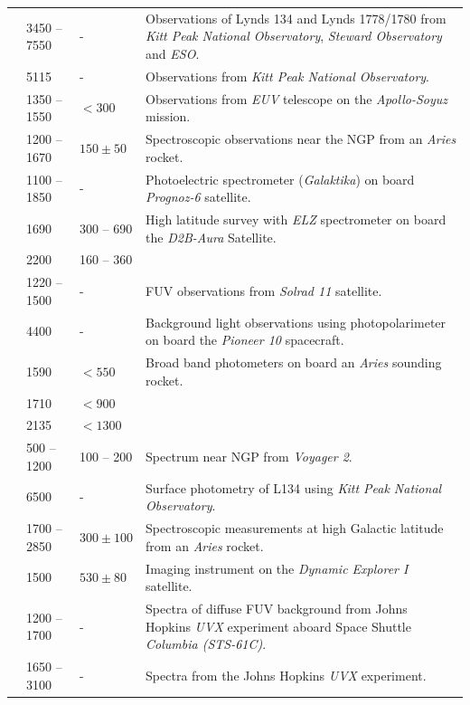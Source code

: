 \documentclass{iau}
\begin{document}
\begin{longtable}{lllp{9cm}}
\citet{Mattila1979} & 3450 -- 7550 & - & Observations of Lynds 134 and Lynds 1778/1780 from \textit{Kitt Peak National Observatory}, \textit{Steward Observatory} and \textit{ESO}. \\
\citet{Dube1979} & 5115 & - & Observations from \textit{Kitt Peak National Observatory}. \\
\citet{Paresce1980} & 1350 -- 1550 & $<300$ & Observations from \textit{EUV} telescope on the \textit{Apollo-Soyuz} mission. \\
\citet{Feldman_hotgas1981} & 1200 -- 1670 & $150 \pm 50$ & Spectroscopic observations near the NGP from an \textit{Aries} rocket. \\
\citet{Zvereva1982} & 1100 -- 1850 & - & Photoelectric spectrometer (\textit{Galaktika}) on board \textit{Prognoz-6} satellite. \\
\citet{Joubert1983} & 1690 & 300 -- 690 & High latitude survey with \textit{ELZ} spectrometer on board the \textit{D2B-Aura} Satellite. \\
 & 2200 & 160 -- 360 & \\
 \citet{Weller1983} & 1220 -- 1500 & - & FUV observations from \textit{Solrad 11} satellite. \\
 \citet{Toller_EBL} & 4400 & - & Background light observations using photopolarimeter on board the \textit{Pioneer 10} spacecraft. \\
 \cite{Jakobsen1984} & 1590 & $<550$ & Broad band photometers on board an \textit{Aries} sounding rocket. \\
  & 1710 & $<900$ & \\
  & 2135 & $<1300$ & \\
\citet{Holberg1986} & 500 -- 1200 & 100 -- 200 & Spectrum near NGP from \textit{Voyager 2}. \\
\citet{Boughn1986} & 6500 & - & Surface photometry of L134 using \textit{Kitt Peak National Observatory}. \\
\citet{Tennyson1988} & 1700 -- 2850 & $300 \pm 100$ & Spectroscopic measurements at high Galactic latitude from an \textit{Aries} rocket. \\
\citet{FixJ1989} & 1500 & $530 \pm 80$ & Imaging instrument on the \textit{Dynamic Explorer I} satellite. \\
\citet{murthyUVX} & 1200 -- 1700 & - & Spectra of diffuse FUV background from Johns Hopkins \textit{UVX} experiment aboard Space Shuttle \textit{Columbia (STS-61C)}. \\
\citet{Murthy1990} & 1650 -- 3100 & - & Spectra from the Johns Hopkins \textit{UVX} experiment. \\

\end{longtable}
\end{document}
